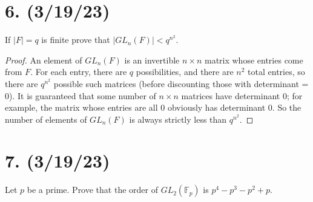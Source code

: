 \documentclass{article}
\begin{document}
\section*{6. (3/19/23)}

If $|F| = q$ is finite prove that $|GL_n(F)| < q^{n^2}$.

\begin{proof}
    An element of $GL_n(F)$ is an invertible $n \times n$ matrix whose entries come from $F$. For each entry, there are $q$ possibilities, and there are $n^2$ total entries, so there are $q^{n^2}$ possible such matrices (before discounting those with determinant = 0). It is guaranteed that some number of $n \times n$ matrices have determinant 0; for example, the matrix whose entries are all 0 obviously has determinant 0. So the number of elements of $GL_n(F)$ is always strictly less than $q^{n^2}$.
\end{proof}

\section*{7. (3/19/23)}

Let $p$ be a prime. Prove that the order of $GL_2(\mathbb{F}_p)$ is $p^4 - p^3 - p^2 + p$.
\end{document}

